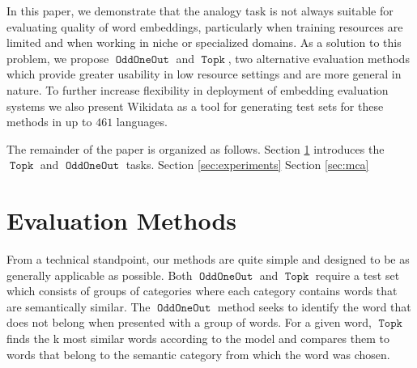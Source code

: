 \documentclass[11pt,a4paper]{article}
\DeclareMathOperator{\OddOneOut}{\texttt{OddOneOut}}
\DeclareMathOperator{\topk}{\texttt{Topk}}
\begin{document}
In this paper, we demonstrate that the analogy task is not always suitable for evaluating quality of word embeddings,
 particularly when training resources are limited and when working in niche or specialized domains. 
 As a solution to this problem, we propose $\OddOneOut$ and $\topk$, two alternative evaluation methods which provide greater usability in low resource settings and are more general in nature.
  To further increase flexibility in deployment of embedding evaluation systems we also present Wikidata as a tool for generating test sets for these methods in up to $461$ languages. 



The remainder of the paper is organized as follows.
Section \ref{sec:method} introduces the $\topk$ and $\OddOneOut$ tasks.
Section \ref{sec:experiments}
Section \ref{sec:mca}

\section{Evaluation Methods}
\label{sec:method}
From a technical standpoint, our methods are quite simple and designed to be as generally applicable as possible.
 Both $\OddOneOut$ and $\topk$ require a test set which consists of groups of categories where each category contains words that are semantically similar. 
 The $\OddOneOut$ method seeks to identify the word that does not belong when presented with a group of words.
  For a given word, $\topk$ finds the k most similar words according to the model and compares them to words that belong to the semantic category from which the word was chosen.
\end{document}
